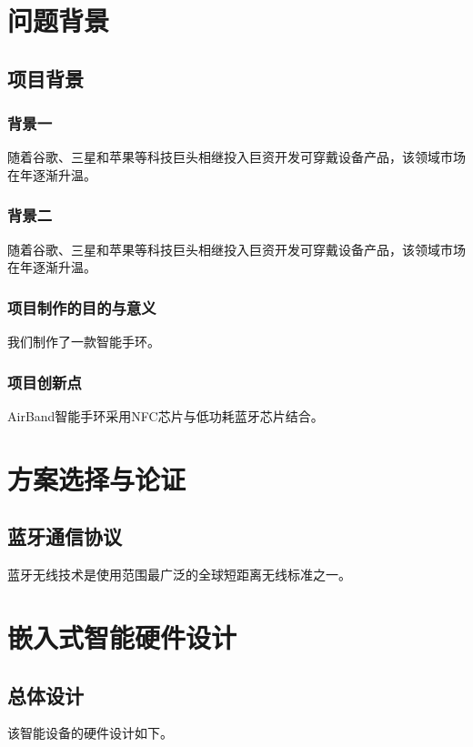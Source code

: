 

\chapter{问题背景}
\section{项目背景}
\subsection{背景一}
随着谷歌、三星和苹果等科技巨头相继投入巨资开发可穿戴设备产品，该领域市场在年逐渐升温\cite{ly}。


\subsection{背景二}
随着谷歌、三星和苹果等科技巨头相继投入巨资开发可穿戴设备产品，该领域市场在年逐渐升温\cite{tx}。 

\subsection{项目制作的目的与意义}
我们制作了一款智能手环。

\subsection{项目创新点}
AirBand智能手环采用NFC芯片与低功耗蓝牙芯片结合。


\chapter{方案选择与论证}


\section{蓝牙通信协议}

蓝牙无线技术是使用范围最广泛的全球短距离无线标准之一。

\chapter{嵌入式智能硬件设计}
\section{总体设计}
该智能设备的硬件设计如下。


